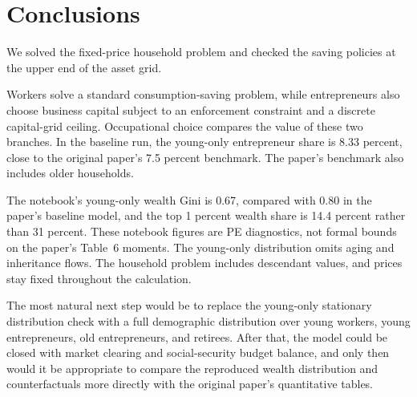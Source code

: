 \documentclass[\latexroot/\projectname]{subfiles}
\begin{document}
\section{Conclusions}\whenintegrated{\label{conclusion}}
\whenintegrated{\label{sec:conclusion}}

We solved the fixed-price household problem and checked the saving policies at the upper end of the asset grid.

Workers solve a standard consumption-saving problem, while entrepreneurs also choose business capital subject to an enforcement constraint and a discrete capital-grid ceiling. Occupational choice compares the value of these two branches. In the baseline run, the young-only entrepreneur share is 8.33 percent, close to the original paper's 7.5 percent benchmark. The paper's benchmark also includes older households.

The notebook's young-only wealth Gini is 0.67, compared with 0.80 in the paper's baseline model, and the top 1 percent wealth share is 14.4 percent rather than 31 percent. These notebook figures are PE diagnostics, not formal bounds on the paper's Table~6 moments. The young-only distribution omits aging and inheritance flows. The household problem includes descendant values, and prices stay fixed throughout the calculation.

The most natural next step would be to replace the young-only stationary distribution check with a full demographic distribution over young workers, young entrepreneurs, old entrepreneurs, and retirees. After that, the model could be closed with market clearing and social-security budget balance, and only then would it be appropriate to compare the reproduced wealth distribution and counterfactuals more directly with the original paper's quantitative tables.

\smartbib
\end{document}
